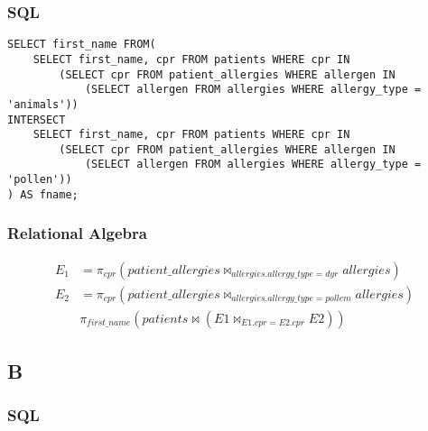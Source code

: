 \documentclass[a4paper,11pt]{article}
\begin{document}
\subsubsection{SQL}
\begin{verbatim}
SELECT first_name FROM( 
    SELECT first_name, cpr FROM patients WHERE cpr IN 
        (SELECT cpr FROM patient_allergies WHERE allergen IN 
            (SELECT allergen FROM allergies WHERE allergy_type = 'animals'))
INTERSECT
    SELECT first_name, cpr FROM patients WHERE cpr IN 
        (SELECT cpr FROM patient_allergies WHERE allergen IN 
            (SELECT allergen FROM allergies WHERE allergy_type = 'pollen')) 
) AS fname;

\end{verbatim}


\subsubsection{Relational Algebra}
\begin{align*}
   E_1&= \pi_{cpr} (patient\_allergies \bowtie_{allergies.allergy\_type=dyr} allergies)\\
   E_2&=  \pi_{cpr} (patient\_allergies \bowtie_{allergies.allergy\_type=pollem} allergies)\\
      & \pi_{first\_name} (patients \bowtie (E1 \bowtie_{E1.cpr=E2.cpr} E2))
\end{align*}

\subsection{B}
\subsubsection{SQL}
\end{document}
